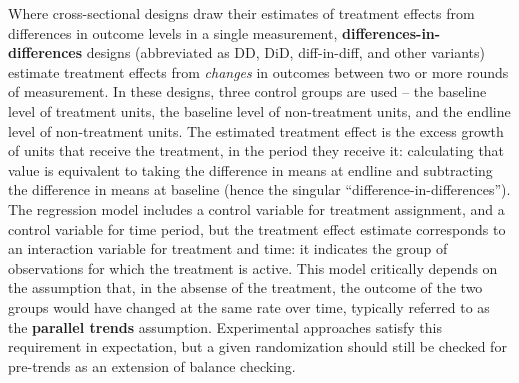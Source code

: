 Where cross-sectional designs draw their estimates of treatment effects
from differences in outcome levels in a single measurement,
\textbf{differences-in-differences}
designs (abbreviated as DD, DiD, diff-in-diff, and other variants)
estimate treatment effects from \textit{changes} in outcomes
between two or more rounds of measurement.
In these designs, three control groups are used –
the baseline level of treatment units,
the baseline level of non-treatment units,
and the endline level of non-treatment units.
The estimated treatment effect is the excess growth
of units that receive the treatment, in the period they receive it:
calculating that value is equivalent to taking
the difference in means at endline and subtracting
the difference in means at baseline
(hence the singular ``difference-in-differences'').\cite{mckenzie2012beyond}
The regression model includes a control variable for treatment assignment,
and a control variable for time period,
but the treatment effect estimate corresponds to
an interaction variable for treatment and time:
it indicates the group of observations for which the treatment is active.
This model critically depends on the assumption that,
in the absense of the treatment,
the outcome of the two groups would have changed at the same rate over time,
typically referred to as the \textbf{parallel trends} assumption.
Experimental approaches satisfy this requirement in expectation,
but a given randomization should still be checked for pre-trends
as an extension of balance checking.

